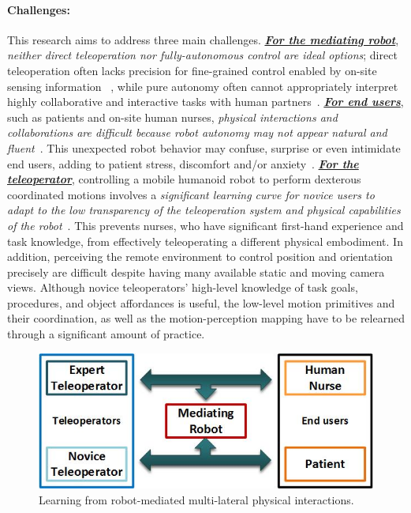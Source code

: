 \documentclass[letterpaper, 11 pt, onecolumn]{article}
\begin{document}
\paragraph*{Challenges:} This research aims to address three main challenges. \underline{\textbf{\textit{For the mediating robot}}}, {\it neither direct teleoperation nor fully-autonomous control are ideal options}; direct teleoperation often lacks precision for fine-grained control enabled by on-site sensing information ~\cite{chen2007human,chen2011supervisory}, while pure autonomy often cannot appropriately interpret highly collaborative and interactive tasks with human partners~\cite{beer2014toward,nahavandi2017trusted,alaieri2016ethical}. \underline{\textbf{\textit{For end users}}}, such as patients and on-site human nurses, {\it physical interactions and collaborations are difficult because robot autonomy may not appear natural and fluent}~\cite{goetz2003matching,strabala2013towards, mitsunaga2008adapting}. This unexpected robot behavior may confuse, surprise or even intimidate end users, adding to patient stress, discomfort and/or anxiety~\cite{nomura2008prediction}. \underline{\textbf{\textit{For the teleoperator}}}, controlling a mobile humanoid robot to perform dexterous coordinated motions involves a {\it significant learning curve for novice users to adapt to the low transparency of the teleoperation system and physical capabilities of the robot}~\cite{rosen2002task,ballantyne2002robotic,novick2003analysis,sudan2012multifactorial,sng2013multiphasic}. This prevents nurses, who have significant first-hand experience and task knowledge, from effectively teleoperating a different physical embodiment.
In addition, perceiving the remote environment to control position and orientation precisely are difficult despite having many available static and moving camera views. Although novice teleoperators' high-level knowledge of task goals, procedures, and object affordances is useful, the low-level motion primitives and their coordination, as well as the motion-perception mapping have to be relearned through a  significant amount of practice. 

\begin{figure}
\vspace{-0.5ex}
\centering
  \includegraphics[width=0.99\linewidth]{fig//001TeleNursing_Overview}
\caption{Learning from robot-mediated multi-lateral physical interactions.}
\label{001TeleNursing_Overview}
\end{figure}
\end{document}
